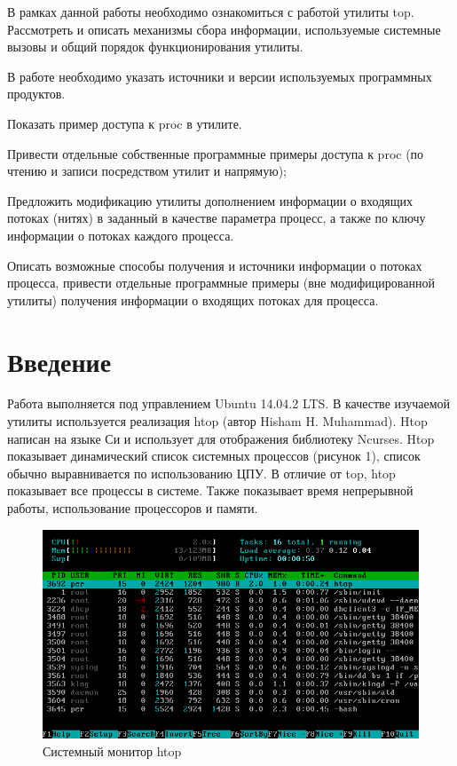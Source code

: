 \documentclass[a4paper, 12pt]{article}		%
\begin{document}
В рамках данной работы необходимо ознакомиться с работой утилиты top. Рассмотреть и описать механизмы сбора информации, используемые системные вызовы и общий порядок функционирования утилиты.
\vspace{3em}

В работе необходимо указать источники и версии используемых программных продуктов.
\vspace{1em}

Показать пример доступа к proc в утилите.
\vspace{1em}

Привести отдельные собственные программные примеры доступа к proc (по чтению и записи посредством утилит и напрямую);
\vspace{1em}

Предложить модификацию утилиты дополнением информации о входящих потоках (нитях) в заданный в качестве параметра процесс, а также по ключу информации о потоках каждого процесса.
\vspace{1em}

Описать возможные способы получения и источники информации о потоках процесса, привести отдельные программные примеры (вне модифицированной утилиты) получения  информации о входящих потоках для процесса.


\newpage
\section*{Введение}

Работа выполняется под управлением Ubuntu 14.04.2 LTS. В качестве изучаемой утилиты используется реализация htop (автор Hisham H. Muhammad). Htop написан на языке Си и использует для отображения библиотеку Ncurses. Htop показывает динамический список системных процессов (рисунок 1), список обычно выравнивается по использованию ЦПУ. В отличие от top, htop показывает все процессы в системе. Также показывает время непрерывной работы, использование процессоров и памяти.

\begin{figure}[h!]
\centering
\includegraphics[scale=0.65]{res/Htop}
\caption{Системный монитор htop}
\end{figure}
\end{document}
